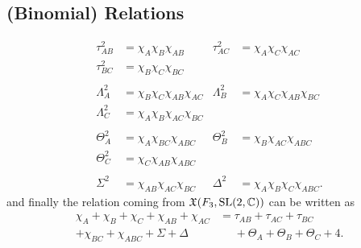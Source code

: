 \documentclass[11pt]{article}
\begin{document}
\subsection{(Binomial) Relations}
\begin{align*}
  \tau_{AB}^2&=\chi_A\chi_B\chi_{AB} &\tau_{AC}^2&=\chi_A\chi_C\chi_{AC}\\
  \tau_{BC}^2&=\chi_B\chi_C\chi_{BC}\\\\
  \Lambda_A^2&=\chi_B\chi_C\chi_{AB}\chi_{AC}
  &\Lambda_B^2&=\chi_A\chi_C\chi_{AB}\chi_{BC}\\
  \Lambda_C^2&=\chi_A\chi_B\chi_{AC}\chi_{BC}\\\\
  \Theta_A^2&=\chi_A\chi_{BC}\chi_{ABC}&\Theta_B^2&=\chi_B\chi_{AC}\chi_{ABC}\\
  \Theta_C^2&=\chi_C\chi_{AB}\chi_{ABC}\\\\
  \Sigma ^2&=\chi_{AB}\chi_{AC}\chi_{BC}&\Delta^2&=\chi_A\chi_B\chi_C\chi_{ABC}.
\end{align*}
and finally the relation coming from $\mathfrak{X}(F_3,\mathrm{SL}(2,\mathbb{C}))$ can be written
as
\begin{align*}
  \chi_A+\chi_B+\chi_C+\chi_{AB}+\chi_{AC}
  &=\tau_{AB}+\tau_{AC}+\tau_{BC}\\
  +\chi_{BC}+\chi_{ABC}+\Sigma+\Delta
  &\phantom{{}={}}+\Theta_A+\Theta_B+\Theta_C+4.
\end{align*}



\end{document}
